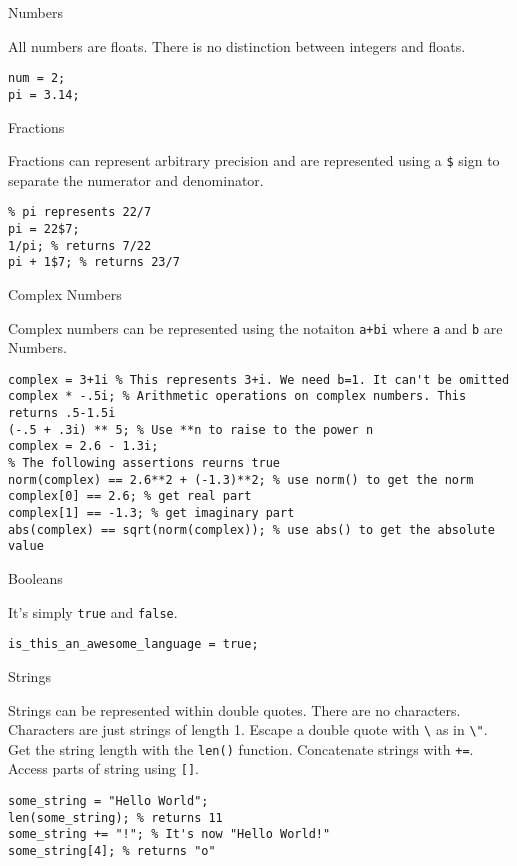 \documentclass[]{article}
\begin{document}
Numbers

All numbers are floats. There is no distinction between integers and
floats.

\begin{verbatim}
num = 2;
pi = 3.14;
\end{verbatim}

Fractions

Fractions can represent arbitrary precision and are represented using a
\texttt{\$} sign to separate the numerator and denominator.

\begin{verbatim}
% pi represents 22/7
pi = 22$7;
1/pi; % returns 7/22
pi + 1$7; % returns 23/7
\end{verbatim}

Complex Numbers

Complex numbers can be represented using the notaiton \texttt{a+bi}
where \texttt{a} and \texttt{b} are Numbers.

\begin{verbatim}
complex = 3+1i % This represents 3+i. We need b=1. It can't be omitted
complex * -.5i; % Arithmetic operations on complex numbers. This returns .5-1.5i
(-.5 + .3i) ** 5; % Use **n to raise to the power n
complex = 2.6 - 1.3i;
% The following assertions reurns true
norm(complex) == 2.6**2 + (-1.3)**2; % use norm() to get the norm
complex[0] == 2.6; % get real part
complex[1] == -1.3; % get imaginary part
abs(complex) == sqrt(norm(complex)); % use abs() to get the absolute value
\end{verbatim}

Booleans

It's simply \texttt{true} and \texttt{false}.

\begin{verbatim}
is_this_an_awesome_language = true;
\end{verbatim}

Strings

Strings can be represented within double quotes. There are no
characters. Characters are just strings of length 1. Escape a double
quote with \texttt{\textbackslash{}} as in \texttt{\textbackslash{}"}.
Get the string length with the \texttt{len()} function. Concatenate
strings with \texttt{+=}. Access parts of string using \texttt{{[}{]}}.

\begin{verbatim}
some_string = "Hello World";
len(some_string); % returns 11
some_string += "!"; % It's now "Hello World!"
some_string[4]; % returns "o"
\end{verbatim}
\end{document}

